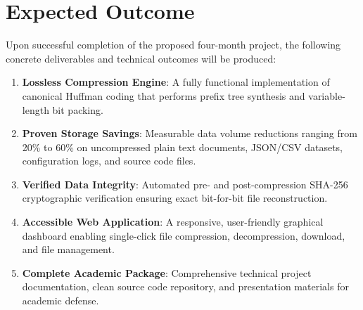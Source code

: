 \documentclass[12pt,a4paper]{article}
\begin{document}
\begin{center}
\label{fig:gantt_diagram}
\end{center}

\clearpage
\section{Expected Outcome}

Upon successful completion of the proposed four-month project, the following concrete deliverables and technical outcomes will be produced:
\begin{enumerate}[itemsep=1pt,topsep=2pt,parsep=0pt]
    \item \textbf{Lossless Compression Engine}: A fully functional implementation of canonical Huffman coding that performs prefix tree synthesis and variable-length bit packing.
    \item \textbf{Proven Storage Savings}: Measurable data volume reductions ranging from 20\% to 60\% on uncompressed plain text documents, JSON/CSV datasets, configuration logs, and source code files.
    \item \textbf{Verified Data Integrity}: Automated pre- and post-compression SHA-256 cryptographic verification ensuring exact bit-for-bit file reconstruction.
    \item \textbf{Accessible Web Application}: A responsive, user-friendly graphical dashboard enabling single-click file compression, decompression, download, and file management.
    \item \textbf{Complete Academic Package}: Comprehensive technical project documentation, clean source code repository, and presentation materials for academic defense.
\end{enumerate}
\end{document}
